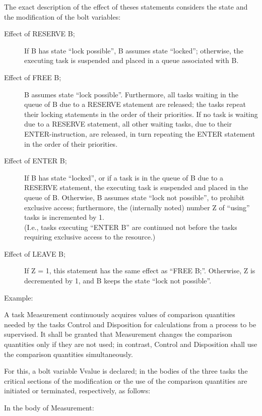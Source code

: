 The exact description of the effect of theses statements considers the
state and the modification of the bolt variables:
\begin{description}
\item[Effect of RESERVE B;]
If B has state ``lock possible'', B assumes state ``locked''; otherwise,
the executing task is suspended and placed in a queue associated with B.
\item[Effect of FREE B;]
B assumes state ``lock possible''. Furthermore, all tasks waiting in the
queue of B due to a RESERVE statement are released; the tasks repeat
their locking statements in the order of their priorities. If no task
is waiting due to a RESERVE statement, all other waiting tasks, due to 
their ENTER-instruction, are released, in turn repeating the ENTER 
statement in the order of their priorities.
\item[Effect of ENTER B;]
If B has state ``locked'', or if a task is in the queue of B due to a
RESERVE statement, the executing task is suspended and placed in the
queue of B. Otherwise, B assumes state ``lock not possible'', to prohibit
exclusive access; furthermore, the (internally noted) number Z of
``using'' tasks is incremented by 1.\\
(I.e., tasks executing ``ENTER B'' are continued not before the tasks
requiring exclusive access to the resource.)
\item[Effect of LEAVE B;]
If Z = 1, this statement has the same effect as ``FREE B;''.
Otherwise, Z is decremented by 1, and B keeps the state ``lock not
possible''.
\end{description}

Example:

A task Measurement continuously acquires values of comparison
quantities needed by the tasks Control and Disposition for
calculations from a process to be supervised. It shall be granted that
Measurement changes the comparison quantities only if they are not
used; in contrast, Control and Disposition shall use the
comparison quantities simultaneously.

For this, a bolt variable Vvalue is declared; in the bodies of the three
tasks the critical sections of the modification or the use of the
comparison quantities are initiated or terminated, respectively, as
follows:

In the body of Measurement:

